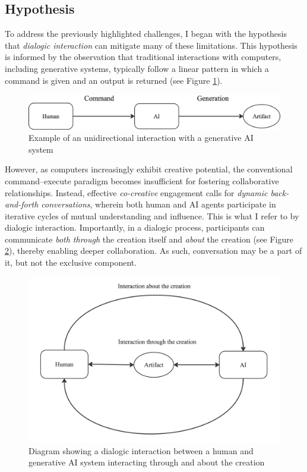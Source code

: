 \subsection{Hypothesis}

To address the previously highlighted challenges, I began with the hypothesis that \emph{dialogic interaction} can mitigate many of these limitations. This hypothesis is informed by the observation that traditional interactions with computers, including generative systems, typically follow a linear pattern in which a command is given and an output is returned (see Figure \ref{fig:unidirectional}). 

\begin{figure}[hbt!]
    \centering
    \includegraphics[width=0.75\linewidth]{unidirectional.png}
    \caption{Example of an unidirectional interaction with a generative AI system}
    \label{fig:unidirectional}
\end{figure}

However, as computers increasingly exhibit creative potential, the conventional command--execute paradigm becomes insufficient for fostering collaborative relationships. Instead, effective \emph{co-creative} engagement calls for \emph{dynamic back-and-forth conversations}, wherein both human and AI agents participate in iterative cycles of mutual understanding and influence. This is what I refer to by dialogic interaction. Importantly, in a dialogic process, participants can communicate \emph{both through} the creation itself and \emph{about} the creation (see Figure \ref{fig:dialogicthroughandabout}), thereby enabling deeper collaboration. As such, conversation may be a part of it, but not the exclusive component. 

\begin{figure}
    \centering
    \includegraphics[width=0.75\linewidth]{dialogicthroughandabout.jpg}
    \caption{Diagram showing a dialogic interaction between a human and generative AI system interacting through and about the creation}
    \label{fig:dialogicthroughandabout}
\end{figure}

